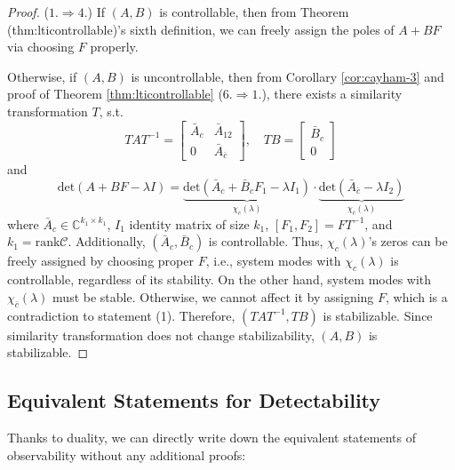 \documentclass[
]{book}
\theoremstyle{definition}
\theoremstyle{definition}
\theoremstyle{definition}
\theoremstyle{definition}
\theoremstyle{remark}
\begin{document}
\begin{proof}
(\(1. \Rightarrow 4.\)) If \((A,B)\) is controllable, then from Theorem (thm:lticontrollable)'s sixth definition, we can freely assign the poles of \(A+BF\) via choosing \(F\) properly.

Otherwise, if \((A,B)\) is uncontrollable, then from Corollary \ref{cor:cayham-3} and proof of Theorem \ref{thm:lticontrollable} (\(6. \Rightarrow 1.\)), there exists a similarity transformation \(T\), s.t.
\begin{equation*}
   TAT^{-1} = \begin{bmatrix}
      \bar{A}_c & \bar{A}_{12} \\
      0 & \bar{A}_{\bar{c}}
   \end{bmatrix}, \quad TB = \begin{bmatrix}
      \bar{B}_c \\
      0
   \end{bmatrix}
\end{equation*}
and
\begin{equation*}
   \text{det}(A+BF-\lambda I) = \underbrace{\text{det}(\bar{A}_c + \bar{B}_c F_1 - \lambda I_1)}_{\chi_c(\lambda)} \cdot 
   \underbrace{\text{det}(\bar{A}_{\bar{c}} - \lambda I_2)}_{\chi_{\bar{c}}(\lambda)}
\end{equation*}
where \(\bar{A}_c \in \mathbb{C}^{k_1 \times k_1}\), \(I_1\) identity matrix of size \(k_1\), \([F_1,F_2] = FT^{-1}\), and \(k_1 = \text{rank} \mathcal{C}\). Additionally, \((\bar{A}_c, \bar{B}_c)\) is controllable. Thus, \(\chi_c(\lambda)\)'s zeros can be freely assigned by choosing proper \(F\), i.e., system modes with \(\chi_c(\lambda)\) is controllable, regardless of its stability. On the other hand, system modes with \(\chi_{\bar{c}}(\lambda)\) must be stable. Otherwise, we cannot affect it by assigning \(F\), which is a contradiction to statement (1). Therefore, \((TAT^{-1}, TB)\) is stabilizable. Since similarity transformation does not change stabilizability, \((A,B)\) is stabilizable.
\end{proof}

\subsection{Equivalent Statements for Detectability}\label{equivalent-statements-for-detectability}

Thanks to duality, we can directly write down the equivalent statements of observability without any additional proofs:
\end{document}
